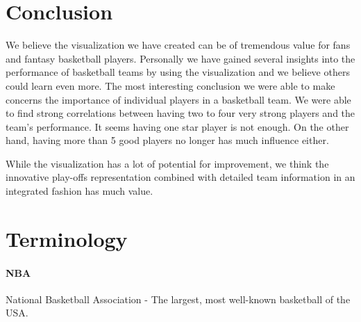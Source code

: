 \documentclass[]{sigchi}
\begin{document}
\section{Conclusion}\label{sec:conclusion}
We believe the visualization we have created can be of tremendous value for fans
and fantasy basketball players. Personally we have gained several insights into
the performance of basketball teams by using the visualization and we believe
others could learn even more. 
The most interesting conclusion we were able to make concerns the importance of
individual players in a basketball team. We were able to find strong
correlations between having two to four very strong players and the team's
performance. It seems having one star player is not enough. On the other hand,
having more than 5 good players no longer has much influence either. 

While the visualization has a lot of potential for improvement, we think the
innovative play-offs representation combined with detailed team information in
an integrated fashion has much value.

%
%
%
%
%
\balance{}

%

\printbibliography

\appendix
\section{Terminology}\label{sec:terminology}

\paragraph{NBA} National Basketball Association - The largest, most well-known
basketball of the USA.
\end{document}
